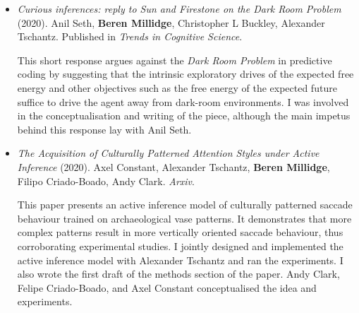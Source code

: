 \begin{itemize}

\item \emph{Curious inferences: reply to Sun and Firestone on the Dark Room Problem} (2020). Anil Seth, \textbf{Beren Millidge}, Christopher L Buckley, Alexander Tschantz. Published in \emph{Trends in Cognitive Science}. 

This short response argues against the \emph{Dark Room Problem} in predictive coding by suggesting that the intrinsic exploratory drives of the expected free energy and other objectives such as the  free energy of the expected future suffice to drive the agent away from dark-room environments. I was involved in the conceptualisation and writing of the piece, although the main impetus behind this response lay with Anil Seth.

\item \emph{The Acquisition of Culturally Patterned Attention Styles under Active Inference} (2020). Axel Constant, Alexander Tschantz, \textbf{Beren Millidge}, Filipo Criado-Boado, Andy Clark. \emph{Arxiv}.

This paper presents an active inference model of culturally patterned saccade behaviour trained on archaeological vase patterns. It demonstrates that more complex patterns result in more vertically oriented saccade behaviour, thus corroborating experimental studies. I jointly designed and implemented the active inference model with Alexander Tschantz and ran the experiments. I also wrote the first draft of the methods section of the paper. Andy Clark, Felipe Criado-Boado, and Axel Constant conceptualised the idea and experiments.





\end{itemize}
